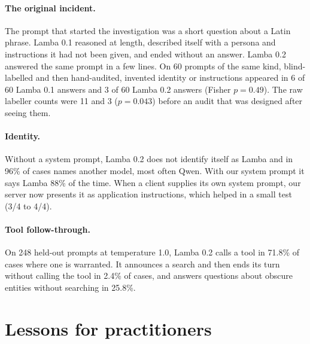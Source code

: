 \documentclass[11pt]{article}
\begin{document}
\paragraph{The original incident.} The prompt that started the investigation was a short question about a Latin phrase. Lamba 0.1 reasoned at length, described itself with a persona and instructions it had not been given, and ended without an answer. Lamba 0.2 answered the same prompt in a few lines. On 60 prompts of the same kind, blind-labelled and then hand-audited, invented identity or instructions appeared in 6 of 60 Lamba 0.1 answers and 3 of 60 Lamba 0.2 answers (Fisher $p=0.49$). The raw labeller counts were 11 and 3 ($p=0.043$) before an audit that was designed after seeing them.

\paragraph{Identity.} Without a system prompt, Lamba 0.2 does not identify itself as Lamba and in 96\% of cases names another model, most often Qwen. With our system prompt it says Lamba 88\% of the time. When a client supplies its own system prompt, our server now presents it as application instructions, which helped in a small test (3/4 to 4/4).

\paragraph{Tool follow-through.} On 248 held-out prompts at temperature 1.0, Lamba 0.2 calls a tool in 71.8\% of cases where one is warranted. It announces a search and then ends its turn without calling the tool in 2.4\% of cases, and answers questions about obscure entities without searching in 25.8\%.

\section{Lessons for practitioners}
\end{document}
